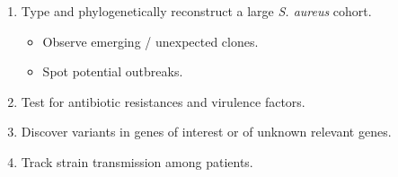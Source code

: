 \begin{multicols}{2}
    \begin{enumerate}
        \item Type and phylogenetically reconstruct a large \emph{S. aureus} cohort.
        \begin{itemize}
            \item Observe emerging / unexpected clones.
            \item Spot potential outbreaks.
        \end{itemize}
        \item Test for antibiotic resistances and virulence factors.
        \item Discover variants in genes of interest or of unknown relevant genes.
        \item Track strain transmission among patients.
    \end{enumerate}
\end{multicols}

